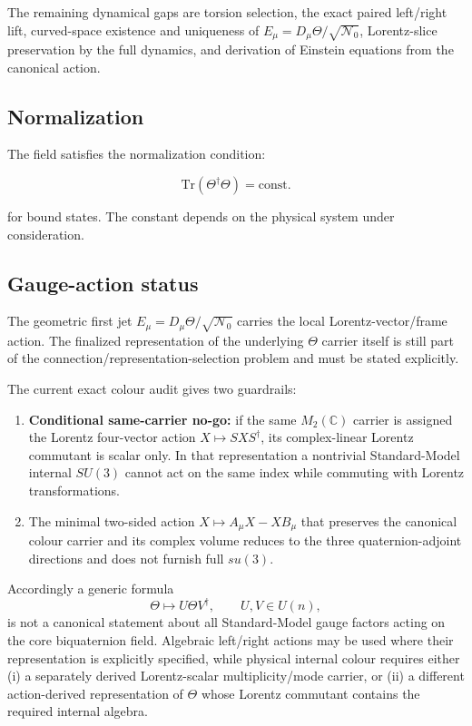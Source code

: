 The remaining dynamical gaps are torsion selection, the exact paired
left/right lift, curved-space existence and uniqueness of
$E_\mu=D_\mu\Theta/\sqrt{\mathcal N_0}$, Lorentz-slice preservation by the full
dynamics, and derivation of Einstein equations from the canonical action.

\subsection{Normalization}

The field satisfies the normalization condition:

\begin{equation}
\label{eq:canonical:theta_normalization}
\text{Tr}(\Theta^\dagger \Theta) = \text{const.}
\end{equation}

for bound states. The constant depends on the physical system under consideration.

\subsection{Gauge-action status}

The geometric first jet $E_\mu=D_\mu\Theta/\sqrt{\mathcal N_0}$ carries the local Lorentz-vector/frame action.  The finalized representation of the underlying $\Theta$ carrier itself is still part of the connection/representation-selection problem and must be stated explicitly.

The current exact colour audit gives two guardrails:
\begin{enumerate}
  \item \textbf{Conditional same-carrier no-go:} if the same $M_2(\mathbb C)$ carrier is assigned the Lorentz four-vector action $X\mapsto SXS^\dagger$, its complex-linear Lorentz commutant is scalar only. In that representation a nontrivial Standard-Model internal $SU(3)$ cannot act on the same index while commuting with Lorentz transformations.
  \item The minimal two-sided action $X\mapsto A_\mu X-XB_\mu$ that preserves the canonical colour carrier and its complex volume reduces to the three quaternion-adjoint directions and does not furnish full $su(3)$.
\end{enumerate}

Accordingly a generic formula
\[
 \Theta\longmapsto U\Theta V^\dagger,\qquad U,V\in U(n),
\]
is not a canonical statement about all Standard-Model gauge factors acting on the core biquaternion field. Algebraic left/right actions may be used where their representation is explicitly specified, while physical internal colour requires either (i) a separately derived Lorentz-scalar multiplicity/mode carrier, or (ii) a different action-derived representation of $\Theta$ whose Lorentz commutant contains the required internal algebra.


